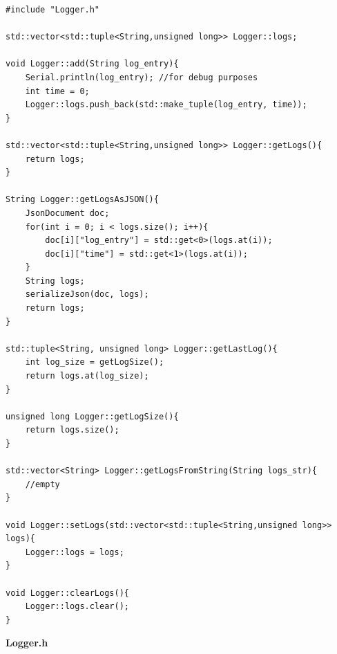 \documentclass[11pt, twoside]{article}
\begin{document}
\begin{lstlisting}
#include "Logger.h"

std::vector<std::tuple<String,unsigned long>> Logger::logs;

void Logger::add(String log_entry){
    Serial.println(log_entry); //for debug purposes
    int time = 0;
    Logger::logs.push_back(std::make_tuple(log_entry, time));
}

std::vector<std::tuple<String,unsigned long>> Logger::getLogs(){
    return logs;
}

String Logger::getLogsAsJSON(){
    JsonDocument doc;
    for(int i = 0; i < logs.size(); i++){
        doc[i]["log_entry"] = std::get<0>(logs.at(i));
        doc[i]["time"] = std::get<1>(logs.at(i));
    }
    String logs;
    serializeJson(doc, logs);
    return logs;
}

std::tuple<String, unsigned long> Logger::getLastLog(){
    int log_size = getLogSize();
    return logs.at(log_size);
}

unsigned long Logger::getLogSize(){
    return logs.size();
}

std::vector<String> Logger::getLogsFromString(String logs_str){
    //empty
}

void Logger::setLogs(std::vector<std::tuple<String,unsigned long>> logs){
    Logger::logs = logs;
}

void Logger::clearLogs(){
    Logger::logs.clear();
}\end{lstlisting}

\textbf{Logger.h}
\end{document}
